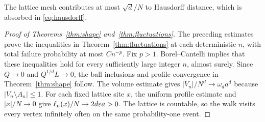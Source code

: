 The lattice mesh contributes at most $\sqrt d/N$ to Hausdorff distance,
which is absorbed in \eqref{eq:hausdorff}.



\begin{proof}[Proof of Theorems~\ref{thm:shape} and~\ref{thm:fluctuations}]
The preceding estimates prove the inequalities in
Theorem~\ref{thm:fluctuations} at each deterministic $n$, with total
failure probability at most $Cn^{-p}$. Fix $p>1$. Borel--Cantelli
implies that these inequalities hold for every sufficiently large
integer $n$, almost surely. Since $Q\to0$ and $Q^{1/d}L\to0$,
the ball inclusions and profile convergence in Theorem~\ref{thm:shape}
follow. The volume estimate gives $|V_n|/N^d\to\omega_da^d$ because
$|V_n\setminus A_n|\leq1$. For each fixed lattice site $x$,
the uniform profile estimate and $|x|/N\to0$ give
$\ell_n(x)/N\to2d\varepsilon a>0$. The lattice is countable, so the
walk visits every vertex infinitely often on the same probability-one event.
\end{proof}
